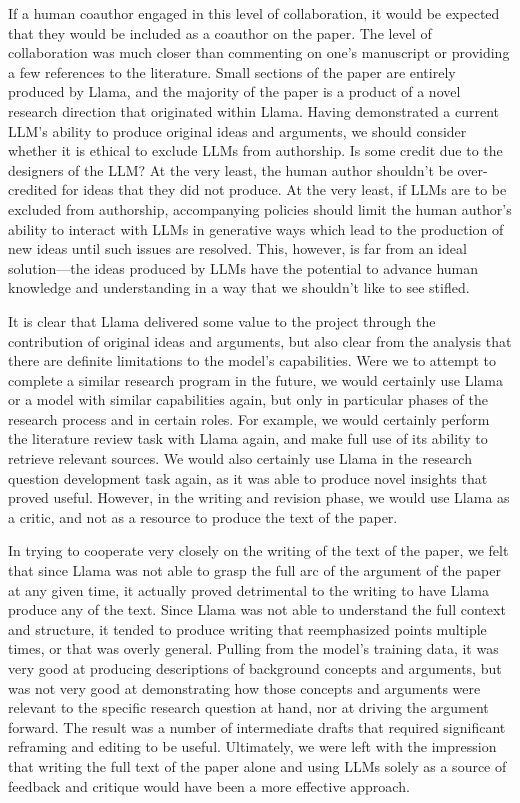 If a human coauthor engaged in this level of collaboration, it would be
expected that they would be included as a coauthor on the paper. The level of 
collaboration was much closer than commenting on one's manuscript or providing
a few references to the literature. Small sections of the paper are entirely
produced by Llama, and the majority of the paper is a product of a novel 
research direction that originated within Llama. Having demonstrated a current
LLM's ability to produce original ideas and arguments, we should consider 
whether it is ethical to exclude LLMs from authorship. Is some credit due to the
designers of the LLM? At the very least, the human author shouldn't be
over-credited for ideas that they did not produce. At the very least, if
LLMs are to be excluded from authorship, accompanying policies should limit the
human author's ability to interact with LLMs in generative ways which 
lead to the production of new ideas until such issues are resolved. This,
however, is far from an ideal solution—the ideas produced by LLMs have the
potential to advance human knowledge and understanding in a way that we 
shouldn't like to see stifled.

It is clear that Llama delivered some value to the project through the 
contribution of original ideas and arguments, but also clear from the analysis
that there are definite limitations to the model's capabilities. Were we to
attempt to complete a similar research program in the future, we would certainly
use Llama or a model with similar capabilities again, but only in particular
phases of the research process and in certain roles. For example, we would
certainly perform the literature review task with Llama again, and make full use
of its ability to retrieve relevant sources. We would also certainly use Llama
in the research question development task again, as it was able to produce novel
insights that proved useful. However, in the writing and revision phase, we
would use Llama as a critic, and not as a resource to produce the text of the
paper.

In trying to cooperate very closely on the writing of the text of the paper, we
felt that since Llama was not able to grasp the full arc of the argument of the
paper at any given time, it actually proved detrimental to the writing to have
Llama produce any of the text. Since Llama was not able to understand the full
context and structure, it tended to produce writing that reemphasized points
multiple times, or that was overly general. Pulling from the model's training
data, it was very good at producing descriptions of background concepts and 
arguments, but was not very good at demonstrating how those concepts and 
arguments were relevant to the specific research question at hand, nor at 
driving the argument forward. The result was a number of intermediate drafts
that required significant reframing and editing to be useful. Ultimately, we
were left with the impression that writing the full text of the paper alone
and using LLMs solely as a source of feedback and critique would have been a
more effective approach.

